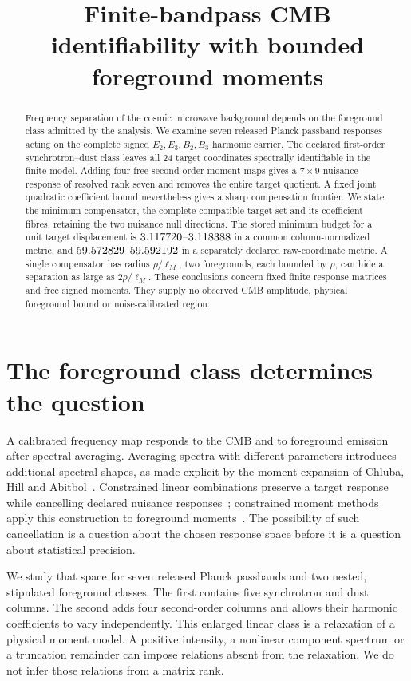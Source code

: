 \documentclass[aps,prd,onecolumn,11pt,nofootinbib,notitlepage]{revtex4-2}
\begin{document}
\title{Finite-bandpass CMB identifiability with bounded foreground moments}
\author{}
\noaffiliation
\begin{abstract}
Frequency separation of the cosmic microwave background depends on the foreground class admitted by the analysis. We examine seven released Planck passband responses acting on the complete signed $E_2,E_3,B_2,B_3$ harmonic carrier. The declared first-order synchrotron--dust class leaves all 24 target coordinates spectrally identifiable in the finite model. Adding four free second-order moment maps gives a $7\times9$ nuisance response of resolved rank seven and removes the entire target quotient. A fixed joint quadratic coefficient bound nevertheless gives a sharp compensation frontier. We state the minimum compensator, the complete compatible target set and its coefficient fibres, retaining the two nuisance null directions. The stored minimum budget for a unit target displacement is $3.117720$--$3.118388$ in a common column-normalized metric, and $59.572829$--$59.592192$ in a separately declared raw-coordinate metric. A single compensator has radius $\rho/\ell_M$; two foregrounds, each bounded by $\rho$, can hide a separation as large as $2\rho/\ell_M$. These conclusions concern fixed finite response matrices and free signed moments. They supply no observed CMB amplitude, physical foreground bound or noise-calibrated region.
\end{abstract}
\maketitle

\section{The foreground class determines the question}

A calibrated frequency map responds to the CMB and to foreground emission after spectral averaging. Averaging spectra with different parameters introduces additional spectral shapes, as made explicit by the moment expansion of Chluba, Hill and Abitbol~\cite{Chluba2017}. Constrained linear combinations preserve a target response while cancelling declared nuisance responses~\cite{Remazeilles2011}; constrained moment methods apply this construction to foreground moments~\cite{Remazeilles2021}. The possibility of such cancellation is a question about the chosen response space before it is a question about statistical precision.

We study that space for seven released Planck passbands and two nested, stipulated foreground classes. The first contains five synchrotron and dust columns. The second adds four second-order columns and allows their harmonic coefficients to vary independently. This enlarged linear class is a relaxation of a physical moment model. A positive intensity, a nonlinear component spectrum or a truncation remainder can impose relations absent from the relaxation. We do not infer those relations from a matrix rank.
\end{document}
